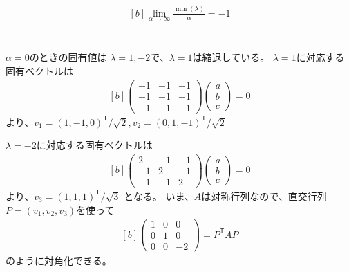 \documentclass[../ap_2012.tex]{subfiles}
\begin{document}
\subsection{}
\begin{equation}\begin{aligned}[b]
    \lim_{\alpha\to\infty}\frac{\min(\lambda)}{\alpha} = -1
\end{aligned}\end{equation}

\section{}
\(\alpha=0\)のときの固有値は
\(\lambda=1,-2\)で、\(\lambda=1\)は縮退している。
\(\lambda=1\)に対応する固有ベクトルは
\begin{equation}\begin{aligned}[b]
    \begin{pmatrix}
        -1 & -1 & -1\\
        -1 & -1 & -1\\
        -1 & -1 & -1
    \end{pmatrix}\begin{pmatrix}
        a\\b\\c
    \end{pmatrix}
    =0
\end{aligned}\end{equation}
より、\(v_1=(1,-1,0)^\mathsf{T}/\sqrt{2},v_2=(0,1,-1)^\mathsf{T}/\sqrt{2}\)

\(\lambda=-2\)に対応する固有ベクトルは
\begin{equation}\begin{aligned}[b]
    \begin{pmatrix}
        2 & -1 & -1\\
        -1 & 2 & -1\\
        -1 & -1 & 2
    \end{pmatrix}\begin{pmatrix}
        a\\b\\c
    \end{pmatrix}
    =0
\end{aligned}\end{equation}
より、\(v_3=(1,1,1)^\mathsf{T}/\sqrt{3}\)
となる。
いま、\(A\)は対称行列なので、直交行列\(P=(v_1,v_2,v_3)\)を使って
\begin{equation}\begin{aligned}[b]
    \begin{pmatrix}
        1 & 0 & 0\\
        0 & 1 & 0\\
        0 & 0 & -2
    \end{pmatrix}
    =P^\mathsf{T}AP
\end{aligned}\end{equation}
のように対角化できる。
\end{document}
